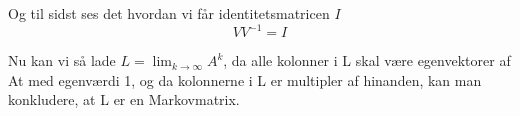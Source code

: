 Og til sidst ses det hvordan vi får identitetsmatricen $I$
$$ VV^{-1} = I$$

Nu kan vi så lade $L = \lim_{k \rightarrow \infty} A^k$, da alle kolonner i L skal være egenvektorer af At med egenværdi 1, og da kolonnerne i L er multipler af hinanden, kan man konkludere, at L er en Markovmatrix.









